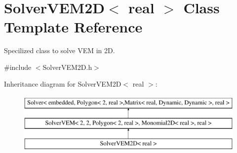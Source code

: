 \hypertarget{class_solver_v_e_m2_d}{}\section{Solver\+V\+E\+M2D$<$ real $>$ Class Template Reference}
\label{class_solver_v_e_m2_d}


Specilized class to solve V\+EM in 2D.  




{\ttfamily \#include $<$Solver\+V\+E\+M2\+D.\+h$>$}

Inheritance diagram for Solver\+V\+E\+M2D$<$ real $>$\+:\begin{figure}[H]
\begin{center}
\leavevmode
\includegraphics[height=3.000000cm]{class_solver_v_e_m2_d}
\end{center}
\end{figure}
